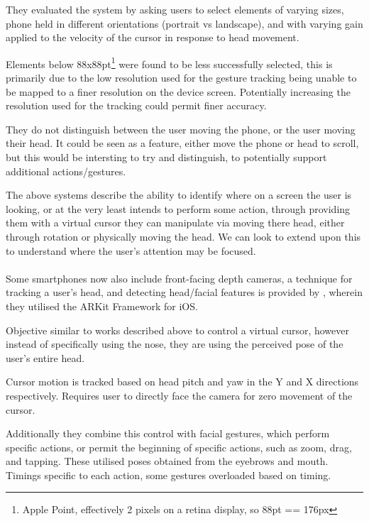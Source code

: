 They evaluated the system by asking users to select elements of varying sizes, phone held in different orientations (portrait vs landscape), and with varying gain applied to the velocity of the cursor in response to head movement.

Elements below 88x88pt\footnote{Apple Point, effectively 2 pixels on a retina display, so 88pt == 176px} were found to be less successfully selected, this is primarily due to the low resolution used for the gesture tracking being unable to be mapped to a finer resolution on the device screen. Potentially increasing the resolution used for the tracking could permit finer accuracy.

They do not distinguish between the user moving the phone, or the user moving their head. It could be seen as a feature, either move the phone or head to scroll, but this would be intersting to try and distinguish, to potentially support additional actions/gestures.

The above systems describe the ability to identify where on a screen the user is looking, or at the very least intends to perform some action, through providing them with a virtual cursor they can manipulate via moving there head, either through rotation or physically moving the head.
We can look to extend upon this to understand where the user's attention may be focused.
\\\\
Some smartphones now also include front-facing depth cameras, a technique for tracking a user's head, and detecting head/facial features is provided by \citeauthor{deepateep2020facial}, wherein they utilised the ARKit Framework for iOS\cite{deepateep2020facial}.

Objective similar to works described above to control a virtual cursor, however instead of specifically using the nose, they are using the perceived pose of the user's entire head.

Cursor motion is tracked based on head pitch and yaw in the Y and X directions respectively. Requires user to directly face the camera for zero movement of the cursor.

Additionally they combine this control with facial gestures, which perform specific actions, or permit the beginning of specific actions, such as zoom, drag, and tapping.
These utilised poses obtained from the eyebrows and mouth. Timings specific to each action, some gestures overloaded based on timing.


